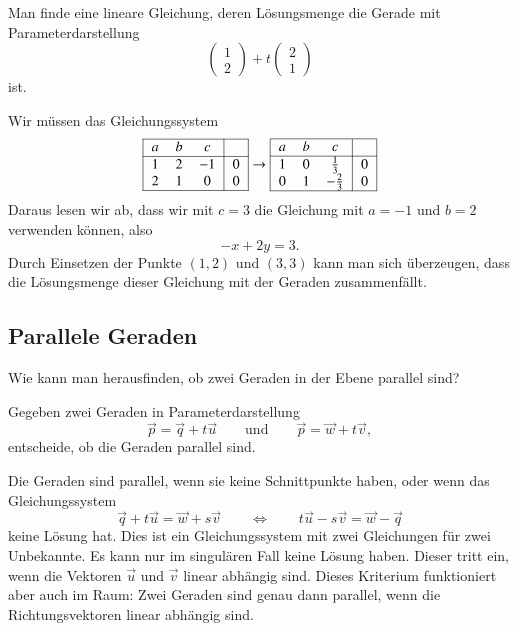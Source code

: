 \begin{beispiel}
Man finde eine lineare Gleichung, deren Lösungsmenge die Gerade mit
Parameterdarstellung
\[
\begin{pmatrix} 1\\2\end{pmatrix} + t\begin{pmatrix}2\\1\end{pmatrix}
\]
ist.
\smallskip

Wir müssen das Gleichungssystem
\[
\begin{tabular}{|>{$}c<{$}>{$}c<{$}>{$}c<{$}|>{$}c<{$}|}
\hline
a&b&c&\\
\hline
1&2&-1&0\\
2&1&0&0\\
\hline
\end{tabular}
\rightarrow
\begin{tabular}{|>{$}c<{$}>{$}c<{$}>{$}c<{$}|>{$}c<{$}|}
\hline
a&b&c&\\
\hline
1&0& \frac13&0\\
0&1&-\frac23&0\\
\hline
\end{tabular}
\]
Daraus lesen wir ab, dass wir mit $c=3$ die Gleichung mit $a=-1$ und $b=2$
verwenden können, also
\[
-x+2y=3.
\]
Durch Einsetzen der Punkte $(1,2)$ und $(3,3)$ kann man sich überzeugen,
dass die Lösungsmenge dieser Gleichung mit der Geraden zusammenfällt.
\qedhere
\end{beispiel}

%
%
\subsection{Parallele Geraden}
Wie kann man herausfinden, ob zwei Geraden in der Ebene parallel sind?

\begin{aufgabe}
Gegeben zwei Geraden in Parameterdarstellung
\[
\vec{p} = \vec{q} + t\vec{u}
\qquad\text{und}\qquad
\vec{p} = \vec{w} + t\vec{v},
\]
entscheide, ob die Geraden parallel sind.
\end{aufgabe}
Die Geraden sind parallel, wenn sie keine Schnittpunkte haben, oder
wenn das Gleichungssystem
\[
\vec{q} + t\vec{u}
=
\vec{w} + s\vec{v}
\qquad\Leftrightarrow\qquad
t\vec{u}
-
s\vec{v}
=
\vec{w}
-
\vec{q}
\]
keine Lösung hat.
Dies ist ein Gleichungssystem mit zwei Gleichungen für zwei Unbekannte.
Es kann nur im singulären Fall keine Lösung haben.
Dieser tritt ein, wenn die Vektoren $\vec{u}$ und $\vec{v}$
linear abhängig sind.
Dieses Kriterium funktioniert aber auch im Raum: Zwei Geraden sind
genau dann parallel, wenn die Richtungsvektoren linear abhängig sind.

